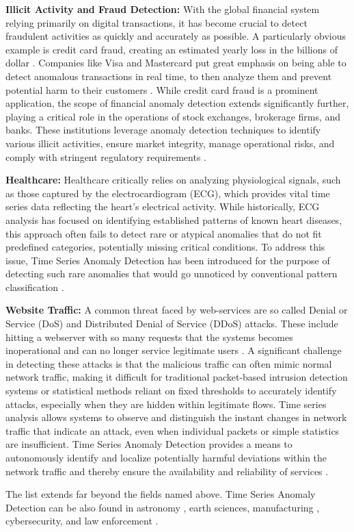 \documentclass[12pt,oneside]{article}
\begin{document}
\textbf{Illicit Activity and Fraud Detection:} With the global financial system relying primarily on digital transactions, it has become crucial to detect fraudulent activities as quickly and accurately as possible. A particularly obvious example is credit card fraud, creating an estimated yearly loss in the billions of dollar \parencites[p.~2]{FinFraud}. Companies like Visa and Mastercard put great emphasis on being able to detect anomalous transactions in real time, to then analyze them and prevent potential harm to their customers \citep{VisaFr}. While credit card fraud is a prominent application, the scope of financial anomaly detection extends significantly further, playing a critical role in the operations of stock exchanges, brokerage firms, and banks. These institutions leverage anomaly detection techniques to identify various illicit activities, ensure market integrity, manage operational risks, and comply with stringent regulatory requirements \citep{DBSurv}. \

\textbf{Healthcare:} Healthcare critically relies on analyzing physiological signals, such as those captured by the electrocardiogram (ECG), which provides vital time series data reflecting the heart's electrical activity. While historically, ECG analysis has focused on identifying established patterns of known heart diseases, this approach often fails to detect rare or atypical anomalies that do not fit predefined categories, potentially missing critical conditions. To address this issue, Time Series Anomaly Detection has been introduced for the purpose of detecting such rare anomalies that would go unnoticed by conventional pattern classification \parencites[p.~1-2]{jiang2024anomalydetectionelectrocardiogramsadvancing}.

\textbf{Website Traffic:} A common threat faced by web-services are so called Denial or Service (DoS) and Distributed Denial of Service (DDoS) attacks. These include hitting a webserver with so many requests that the systems becomes inoperational and can no longer service legitimate users \citep{BSI1}. A significant challenge in detecting these attacks is that the malicious traffic can often mimic normal network traffic, making it difficult for traditional packet-based intrusion detection systems or statistical methods reliant on fixed thresholds to accurately identify attacks, especially when they are hidden within legitimate flows. Time series analysis allows systems to observe and distinguish the instant changes in network traffic that indicate an attack, even when individual packets or simple statistics are insufficient. Time Series Anomaly Detection provides a means to autonomously identify and localize potentially harmful deviations within the network traffic and thereby ensure the availability and reliability of services \parencites[pp.~1-2]{FOULADI2020102587}. \par
The list extends far beyond the fields named above. Time Series Anomaly Detection can be also found in astronomy \citep{astro}, earth sciences, manufacturing \parencites[p.~1]{Zamanzadeh_Darban_2024}, cybersecurity, and law enforcement \parencites[p.~1]{boniol2024divetimeseriesanomalydetection}.
\end{document}

